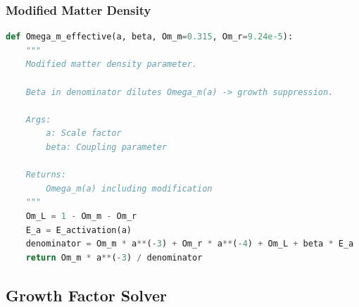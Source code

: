 \documentclass[11pt]{article}
\begin{document}
\subsubsection{Modified Matter Density}

\begin{lstlisting}[language=Python]
def Omega_m_effective(a, beta, Om_m=0.315, Om_r=9.24e-5):
    """
    Modified matter density parameter.
    
    Beta in denominator dilutes Omega_m(a) -> growth suppression.
    
    Args:
        a: Scale factor
        beta: Coupling parameter
    
    Returns:
        Omega_m(a) including modification
    """
    Om_L = 1 - Om_m - Om_r
    E_a = E_activation(a)
    denominator = Om_m * a**(-3) + Om_r * a**(-4) + Om_L + beta * E_a
    return Om_m * a**(-3) / denominator
\end{lstlisting}

\subsection{Growth Factor Solver}
\end{document}
